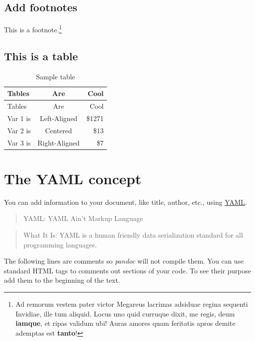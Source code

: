 \documentclass[
]{article}
\begin{document}
\hypertarget{add-footnotes}{%
\subsection{Add footnotes}\label{add-footnotes}}

This is a footnote.\footnote{Ad remorum vestem pater victor Megareus
  lacrimas adsiduae regina sequenti Invidiae, ille tum aliquid. Locus
  uno quid curruque dixit, me regis, deum \textbf{iamque}, et ripas
  validum ubi! Auras amores quam feritatis apros demite ademptas est
  \textbf{tanto}!}

\hypertarget{this-is-a-table}{%
\subsection{This is a table}\label{this-is-a-table}}

\begin{longtable}[]{@{}lcr@{}}
\caption{Sample table}\tabularnewline
\toprule
Tables & Are & Cool \\
\midrule
\endfirsthead
\toprule
Tables & Are & Cool \\
\midrule
\endhead
Var 1 is & Left-Aligned & \$1271 \\
Var 2 is & Centered & \$13 \\
Var 3 is & Right-Aligned & \$7 \\
\bottomrule
\end{longtable}

\hypertarget{the-yaml-concept}{%
\section{The YAML concept}\label{the-yaml-concept}}

You can add information to your document, like title, author, etc.,
using \href{https://yaml.org/}{YAML}.

\begin{quote}
YAML: YAML Ain't Markup Language
\end{quote}

\begin{quote}
What It Is: YAML is a human friendly data serialization standard for all
programming languages.
\end{quote}

The following lines are comments so \emph{pandoc} will not compile them.
You can use standard HTML tags to comments out sections of your code. To
see their purpose add them to the beginning of the text.
\end{document}
